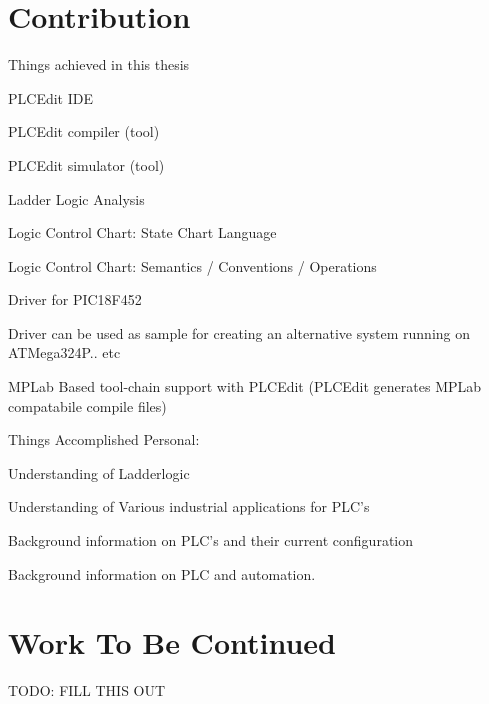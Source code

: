 \section{Contribution}

Things achieved in this thesis

PLCEdit IDE

PLCEdit compiler (tool)

PLCEdit simulator (tool)

Ladder Logic Analysis

Logic Control Chart: State Chart Language

Logic Control Chart: Semantics / Conventions / Operations


Driver for PIC18F452

Driver can be used as sample for creating an alternative system running on ATMega324P.. etc


MPLab Based tool-chain support with PLCEdit (PLCEdit generates MPLab compatabile compile files)


Things Accomplished Personal:

Understanding of Ladderlogic

Understanding of Various industrial applications for PLC's

Background information on PLC's and their current configuration

Background information on PLC and automation.


\section{Work To Be Continued}

TODO: FILL THIS OUT